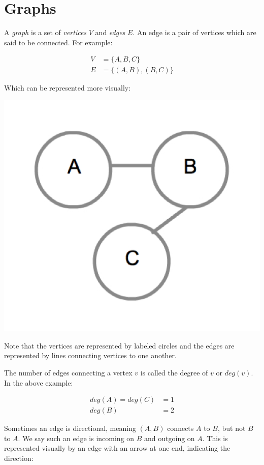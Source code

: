 \chapter{Graphs}

A \emph{graph} is a set of \emph{vertices} $V$ and \emph{edges} $E$.
An edge is a pair of vertices which are said to be connected.  For
example:

\begin{align*} 
V &= \{ A, B, C \} \\ E &= \{ (A, B), (B, C) \} 
\end{align*}

Which can be represented more visually:

{
  \includegraphics[scale=0.2]{SimpleGraph}
  \label{fig:SimpleGraph}
}

Note that the vertices are represented by labeled circles and the
edges are represented by lines connecting vertices to one another.

The number of edges connecting a vertex $v$ is called the degree of
$v$ or $deg(v)$.  In the above example:

\begin{align*}
deg(A) = deg(C) &= 1 \\
deg(B) &= 2
\end{align*}

Sometimes an edge is directional, meaning $(A, B)$ connects $A$ to
$B$, but not $B$ to $A$.  We say such an edge is incoming on $B$ and
outgoing on $A$.  This is represented visually by an edge with an
arrow at one end, indicating the direction:

